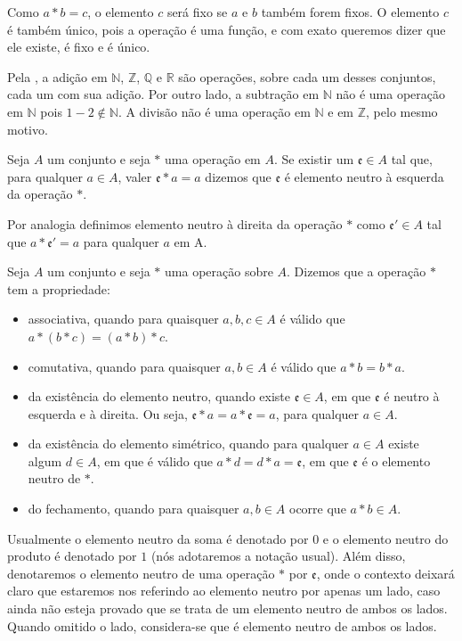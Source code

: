 \documentclass[../main.tex]{subfiles}
\begin{document}
\begin{obs}\label{agb-obs-operacao}
    Como $a*b = c$, o elemento $c$ será fixo se $a$ e $b$ também forem fixos. O elemento $c$ é também único, pois a operação é uma função, e com exato queremos dizer que ele existe, é fixo e é único. 
\end{obs}

Pela , a adição em $\mathbb{N}$, $\mathbb{Z}$, $\mathbb{Q}$ e $\mathbb{R}$ são operações, sobre cada um desses conjuntos, cada um com sua adição. Por outro lado, a subtração em $\mathbb{N}$ não é uma operação em $\mathbb{N}$ pois $1-2 \not \in \mathbb{N}$. A divisão não é uma operação em $\mathbb{N}$ e em $\mathbb{Z}$, pelo mesmo motivo.

\begin{defi}
    Seja $A$ um conjunto e seja $*$ uma operação em $A$. Se existir um $\mathfrak{e} \in A$ tal que, para qualquer $a \in A$, valer $\mathfrak{e} * a = a$ dizemos que $\mathfrak{e}$ é elemento neutro à esquerda da operação $*$. 
\end{defi}
Por analogia definimos elemento neutro à direita da operação $*$ como $\mathfrak{e'} \in A$ tal que $a * \mathfrak{e'} = a$ para qualquer $a$ em A.

\begin{defi}\label{agb-def-propriedades}
    Seja $A$ um conjunto e seja $*$ uma operação sobre $A$. Dizemos que a operação $*$ tem a propriedade:
    \begin{itemize}
        \item associativa, quando para quaisquer $a,b,c \in A$ é válido que $ a * ( b * c ) = ( a * b ) * c$.
        \item comutativa, quando para quaisquer $a,b \in A$ é válido que $a * b = b * a$.
        \item da existência do elemento neutro, quando existe $\mathfrak{e} \in A$, em que $\mathfrak{e}$ é neutro à esquerda e à direita. Ou seja, $\mathfrak{e} * a = a * \mathfrak{e} = a$, para qualquer $a \in A$. 
        \item da existência do elemento simétrico, quando para qualquer $a \in A$ existe algum $d \in A$, em que é válido que $a * d = d * a = \mathfrak{e}$, em que $\mathfrak{e}$ é o elemento neutro de $*$.
        \item do fechamento, quando para quaisquer $a, b \in A$ ocorre que $a * b \in A$.   
    \end{itemize}
\end{defi}
Usualmente o elemento neutro da soma é denotado por $0$ e o elemento neutro do produto é denotado por $1$ (nós adotaremos a notação usual). Além disso, denotaremos o elemento neutro de uma operação $*$ por $\mathfrak{e}$, onde o contexto deixará claro que estaremos nos referindo ao elemento neutro por apenas um lado, caso ainda não esteja provado que se trata de um elemento neutro de ambos os lados. Quando omitido o lado, considera-se que é elemento neutro de ambos os lados.
\end{document}
